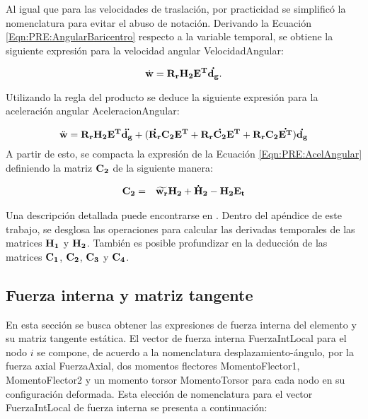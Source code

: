 Al igual que para las velocidades de traslación, por practicidad se simplificó la nomenclatura para evitar el abuso de notación. Derivando la Ecuación \eqref{Eqn:PRE:AngularBaricentro} respecto a la variable temporal, se obtiene la siguiente expresión para la velocidad angular \gls{VelocidadAngular}:

\begin{equation}
	\label{Eqn:PRE:VelAngular}
	\dot{\bf{w}}=\bf{R}_r\bf{H}_2\bf{E}^T\dot{{\bf{d_g}}}.
\end{equation}

Utilizando la regla del producto se deduce la siguiente expresión para la aceleración angular \gls{AceleracionAngular}:

\begin{equation}
	\label{Eqn:PRE:AcelAngular}
	\ddot{\bf{w}}=\bf{R}_r\bf{H}_2\bf{E}^T\ddot{{\bf{d_g}}}+ (\dot{\bf{R}_r} \bf{C}_2 \bf{E}^T + \bf{R}_r \dot{\bf{C}_2} \bf{E}^T + \bf{R}_r \bf{C}_2 \dot{\bf{E}^T}   ) \dot{ \bf{d}_g }
\end{equation}
A partir de esto, se compacta la expresión de la Ecuación \eqref{Eqn:PRE:AcelAngular} definiendo la matriz $\bf{C}_2$ de la siguiente manera:

\begin{eqnarray}
	\label{Eqn:PRE:DefC}
	\bf{C}_2&=&\widetilde{\bf{w}_r}\bf{H}_2+\bf{\dot{H}_2}-\bf{H}_2\bf{E}_t\\
\end{eqnarray}

Una descripción detallada puede encontrarse en \citep{Le2014}. Dentro del apéndice de este trabajo, se desglosa las operaciones para calcular las derivadas temporales de las matrices $\bf{H}_1$ y $\bf{H}_2$. También es posible profundizar en la deducción de las matrices $\bf{C_1}$, $\bf{C_2}$, $\bf{C_3}$ y $\bf{C_4}$.

\subsection{Fuerza interna y matriz tangente}\label{Sec:PRE:Interna}

En esta sección se busca obtener las expresiones de fuerza interna del elemento y su matriz tangente estática. El vector de fuerza interna \gls{FuerzaIntLocal} para el nodo $i$ se compone, de acuerdo a la nomenclatura desplazamiento-ángulo, por la fuerza axial \gls{FuerzaAxial}, dos momentos flectores \gls{MomentoFlector1}, \gls{MomentoFlector2} y un momento torsor \gls{MomentoTorsor} para cada nodo en su configuración deformada. Esta elección de nomenclatura para el vector \gls{FuerzaIntLocal} de fuerza interna se presenta a continuación:

